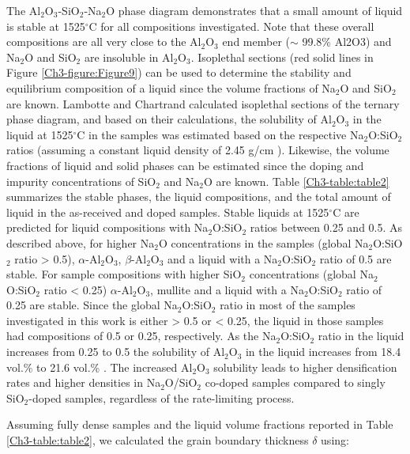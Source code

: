 The Al$_{2}$O$_{3}$-SiO$_{2}$-Na$_{2}$O phase diagram demonstrates that a small amount of liquid is stable at 1525$^{\circ}$C for all compositions investigated. Note that these overall compositions are all very close to the Al$_{2}$O$_{3}$ end member ($\sim$ 99.8\% Al2O3) and Na$_{2}$O and SiO$_{2}$ are insoluble in Al$_{2}$O$_{3}$. Isoplethal sections (red solid lines in Figure \ref{Ch3-figure:Figure9}) can be used to determine the stability and equilibrium composition of a liquid since the volume fractions of Na$_{2}$O and SiO$_{2}$ are known. Lambotte and Chartrand \cite{Lambotte2013} calculated isoplethal sections of the ternary phase diagram, and based on their calculations, the solubility of Al$_{2}$O$_{3}$ in the liquid at 1525$^{\circ}$C in the samples was estimated based on the respective Na$_{2}$O:SiO$_{2}$ ratios (assuming a constant liquid density of 2.45 g/cm \cite{Standard2013,Day1962}). Likewise, the volume fractions of liquid and solid phases can be estimated since the doping and impurity concentrations of SiO$_{2}$ and Na$_{2}$O are known. Table \ref{Ch3-table:table2} summarizes the stable phases, the liquid compositions, and the total amount of liquid in the as-received and doped samples. Stable liquids at 1525$^{\circ}$C are predicted for liquid compositions with Na$_{2}$O:SiO$_{2}$ ratios between 0.25 and 0.5. As described above, for higher Na$_{2}$O concentrations in the samples (global Na$_{2}$O:SiO$_{2}$ ratio > 0.5), $\alpha$-Al$_{2}$O$_{3}$, $\beta$-Al$_{2}$O$_{3}$ and a liquid with a Na$_{2}$O:SiO$_{2}$ ratio of 0.5 are stable. For sample compositions with higher SiO$_{2}$ concentrations (global Na$_{2}$O:SiO$_{2}$ ratio < 0.25) $\alpha$-Al$_{2}$O$_{3}$, mullite and a liquid with a Na$_{2}$O:SiO$_{2}$ ratio of 0.25 are stable. Since the global Na$_{2}$O:SiO$_{2}$ ratio in most of the samples investigated in this work is either > 0.5 or < 0.25, the liquid in those samples had compositions of 0.5 or 0.25, respectively. As the Na$_{2}$O:SiO$_{2}$ ratio in the liquid increases from 0.25 to 0.5 the solubility of Al$_{2}$O$_{3}$ in the liquid increases from 18.4 vol.\% to 21.6 vol.\% \cite{Lambotte2013}. The increased Al$_{2}$O$_{3}$ solubility leads to higher densification rates and higher densities in Na$_{2}$O/SiO$_{2}$ co-doped samples compared to singly SiO$_{2}$-doped samples, regardless of the rate-limiting process. 

Assuming fully dense samples and the liquid volume fractions reported in Table \ref{Ch3-table:table2}, we calculated the grain boundary thickness $\delta$ using:

